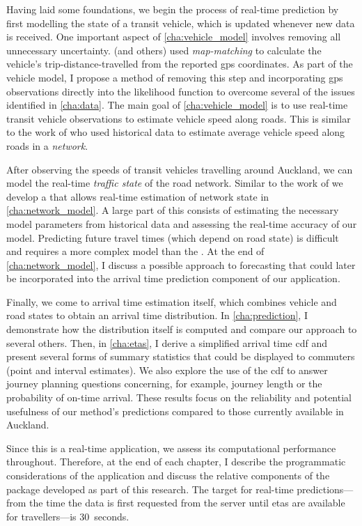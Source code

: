 Having laid some foundations, we begin the process of real-time prediction by first modelling the state of a transit vehicle, which is updated whenever new data is received. One important aspect of \cref{cha:vehicle_model} involves removing all unnecessary uncertainty.  (and others) used \emph{map-matching} to calculate the vehicle's trip-distance-travelled from the reported \gls{gps} coordinates. As part of the vehicle model, I propose a method of removing this step and incorporating \gls{gps} observations directly into the likelihood function to overcome several of the issues identified in \cref{cha:data}. The main goal of \cref{cha:vehicle_model} is to use real-time transit vehicle observations to estimate vehicle speed along roads. This is similar to the work of \citet{Celan_2017,Celan_2018} who used historical data to estimate average vehicle speed along roads in a \emph{network}.


After observing the speeds of transit vehicles travelling around Auckland, we can model the real-time \emph{traffic state} of the road network. Similar to the work of \citet{Shalaby_2004} we develop a \kf{} that allows real-time estimation of network state in \cref{cha:network_model}. A large part of this consists of estimating the necessary model parameters from historical data and assessing the real-time accuracy of our model. Predicting future travel times (which depend on road state) is difficult \citep{He_2020} and requires a more complex model than the \kf{}. At the end of \cref{cha:network_model}, I discuss a possible approach to forecasting that could later be incorporated into the arrival time prediction component of our application.


Finally, we come to arrival time estimation itself, which combines vehicle and road states to obtain an arrival time distribution. In \cref{cha:prediction}, I demonstrate how the distribution itself is computed and compare our approach to several others. Then, in \cref{cha:etas}, I derive a simplified arrival time \gls{cdf} and present several forms of summary statistics that could be displayed to commuters (point and interval estimates).  We also explore the use of the \gls{cdf} to answer journey planning questions concerning, for example, journey length or the probability of on-time arrival. These results focus on the reliability and potential usefulness of our method's predictions compared to those currently available in Auckland.


Since this is a real-time application, we assess its computational performance throughout. Therefore, at the end of each chapter, I describe the programmatic considerations of the application and discuss the relative components of the \Rstats{} package  developed as part of this research. The target for real-time predictions---from the time the data is first requested from the server until \glspl{eta} are available for travellers---is 30~seconds.


